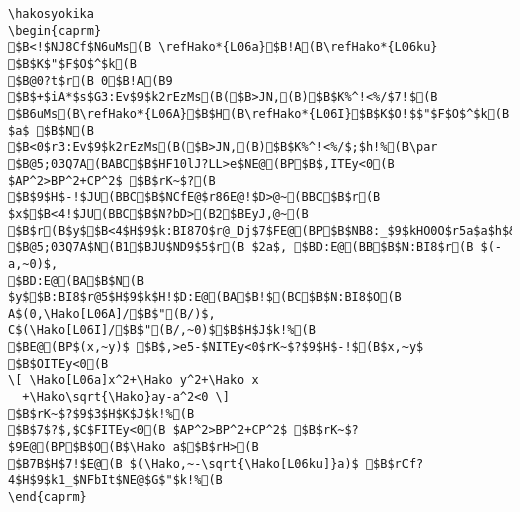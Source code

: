\begin{verbatim}
\hakosyokika
\begin{caprm}
$B<!$NJ8Cf$N6uMs(B \refHako*{L06a}$B!A(B\refHako*{L06ku} $B$K$"$F$O$^$k(B
$B@0?t$r(B 0$B!A(B9 $B$+$iA*$s$G3:Ev$9$k2rEzMs(B($B>JN,(B)$B$K%^!<%/$7!$(B
$B6uMs(B\refHako*{L06A}$B$H(B\refHako*{L06I}$B$K$O!$$"$F$O$^$k(B $a$ $B$N(B
$B<0$r3:Ev$9$k2rEzMs(B($B>JN,(B)$B$K%^!<%/$;$h!%(B\par
$B@5;03Q7A(BABC$B$HF10lJ?LL>e$NE@(BP$B$,ITEy<0(B $AP^2>BP^2+CP^2$ $B$rK~$?(B
$B$9$H$-!$JU(BBC$B$NCfE@$r86E@!$D>@~(BBC$B$r(B $x$$B<4!$JU(BBC$B$N?bD>(B2$BEyJ,@~(B
$B$r(B$y$$B<4$H$9$k:BI87O$r@_Dj$7$FE@(BP$B$NB8:_$9$kHO0O$r5a$a$h$&!%(B
$B@5;03Q7A$N(B1$BJU$ND9$5$r(B $2a$, $BD:E@(BB$B$N:BI8$r(B $(-a,~0)$, 
$BD:E@(BA$B$N(B $y$$B:BI8$r@5$H$9$k$H!$D:E@(BA$B!$(BC$B$N:BI8$O(B 
A$(0,\Hako[L06A]/$B$"(B/)$, C$(\Hako[L06I]/$B$"(B/,~0)$$B$H$J$k!%(B
$BE@(BP$(x,~y)$ $B$,>e5-$NITEy<0$rK~$?$9$H$-!$(B$x,~y$ $B$OITEy<0(B
\[ \Hako[L06a]x^2+\Hako y^2+\Hako x
  +\Hako\sqrt{\Hako}ay-a^2<0 \]
$B$rK~$?$9$3$H$K$J$k!%(B
$B$7$?$,$C$FITEy<0(B $AP^2>BP^2+CP^2$ $B$rK~$?$9E@(BP$B$O(B$\Hako a$$B$rH>(B
$B7B$H$7!$E@(B $(\Hako,~-\sqrt{\Hako[L06ku]}a)$ $B$rCf?4$H$9$k1_$NFbIt$NE@$G$"$k!%(B
\end{caprm}
\end{verbatim}
